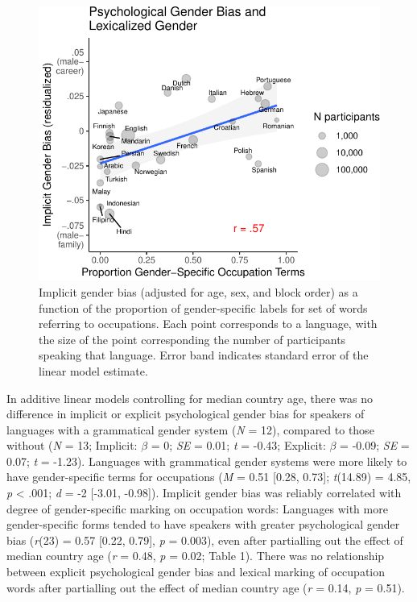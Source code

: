 \documentclass[man,floatsintext]{apa6}
\begin{document}
\begin{figure}
\centering
\includegraphics{iat_lang_files/figure-latex/unnamed-chunk-14-1.pdf}
\caption{\label{fig:unnamed-chunk-14}Implicit gender bias (adjusted for age, sex, and block order) as a function of the proportion of gender-specific labels for set of words referring to occupations. Each point corresponds to a language, with the size of the point corresponding the number of participants speaking that language. Error band indicates standard error of the linear model estimate.}
\end{figure}

In additive linear models controlling for median country age, there was no difference in implicit or explicit psychological gender bias for speakers of languages with a grammatical gender system (\emph{N} = 12), compared to those without (\emph{N} = 13; Implicit: \(\beta\) = 0; \emph{SE} = 0.01; \emph{t} = -0.43; Explicit: \(\beta\) = -0.09; \emph{SE} = 0.07; \emph{t} = -1.23). Languages with grammatical gender systems were more likely to have gender-specific terms for occupations (\emph{M} = 0.51 {[}0.28, 0.73{]}; \emph{t}(14.89) = 4.85, \emph{p} \textless{} .001; \emph{d} = -2 {[}-3.01, -0.98{]}). Implicit gender bias was reliably correlated with degree of gender-specific marking on occupation words: Languages with more gender-specific forms tended to have speakers with greater psychological gender bias (\emph{r}(23) = 0.57 {[}0.22, 0.79{]}, \emph{p} = 0.003), even after partialling out the effect of median country age (\emph{r} = 0.48, \emph{p} = 0.02; Table 1). There was no relationship between explicit psychological gender bias and lexical marking of occupation words after partialling out the effect of median country age (\emph{r} = 0.14, \emph{p} = 0.51).
\end{document}
